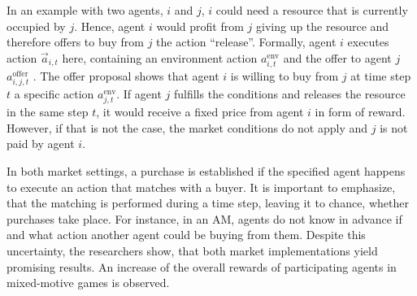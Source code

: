 In an example with two agents, $i$ and $j$, $i$ could need a resource that is currently occupied by $j$. Hence, agent $i$ would profit from $j$ giving up the resource and therefore offers to buy from $j$ the action ``release''. Formally, agent $i$ executes action $\overrightarrow{a}_{i,t}$ here, containing an environment action $a^{\text{env}}_{i,t}$ and the offer to agent $j$ $a^{\text{offer}}_{i,j,t}$ \cite{scbe21}. The offer proposal shows that agent $i$ is willing to buy from $j$ at time step $t$ a specific action $a^{\text{env}}_{j,t}$. If agent $j$ fulfills the conditions and releases the resource in the same step $t$, it would receive a fixed price from agent $i$ in form of reward. However, if that is not the case, the market conditions do not apply and $j$ is not paid by agent $i$.

In both market settings, a purchase is established if the specified agent happens to execute an action that matches with a buyer. It is important to emphasize, that the matching is performed during a time step, leaving it to chance, whether purchases take place. For instance, in an AM, agents do not know in advance if and what action another agent could be buying from them. Despite this uncertainty, the researchers show, that both market implementations yield promising results. An increase of the overall rewards of participating agents in mixed-motive games is observed.